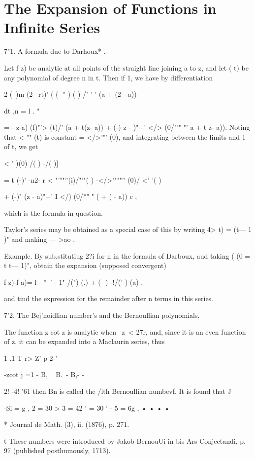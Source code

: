 \chapter{The Expansion of Functions in Infinite Series} 

7"1. A formula due to Darhoux* .

Let f z) be analytic at all points of the straight line joining a to
z, and let ( t) be any polynomial of degree n in t. Then if 1, we have
by differentiation

2 (\ )m (2 \ rt)' ( ( -" ) ( ) /' ' ' (a + (2 - a))

dt ,n = l . "

= - z-a) (f)"'> (t)/' (a + t(z- a)) + (-) z - )"+' </> (0/"'" "' a + t
z- a)). Noting that < "" (t) is constant = </>'"' (0), and integrating
between the limits and 1 of t, we get

< ' )(0) /( ) -/( )]

= t (-)' -n2- r < "'""''(i)/"'"( ) -</>'"""'' (0)/ <' '( )

+ (-)" (z - a)"+' I </) (0/*" " ( + ( - a)) c ,

which is the formula in question.

Taylor's series may be obtained as a special case of this by writing
4> t) = (t— 1 )" and making — >ao .

Example. By sub.stitutiug 2?i for n in the formula of Darboux, aud
taking ( (0 = t t— 1)", obtain the expansion (supposed convergent)

f z)-f a)= l - ''~' - 1" /(") (.) + (- ) -!/('-) (a) ,

and tind the expression for the remainder after n terms in this
series.

7'2. The Bej'noidlian number's and the Bernoullian polynomials.

The function z cot z is analytic when \ z\ < 27r, and, since it is an
even function of z, it can be expanded into a Maclaurin series, thus



1 ,1 T r> Z' p 2-'

-zcot j =1 - B, ~ B.~- B,- -



2! -4! '61 then Bn is called the /ith Bernoullian numbevf. It is found
that J

-Si = g , 2 = 30 > 3 = 42 ' = 30 ' - 5 = 6g , • • • •

* Journal de Math. (3), ii. (1876), p. 271.

t These numbers were introduced by Jakob BernouUi in bis Ars
Conjectandi, p. 97 (published posthumously, 1713).

